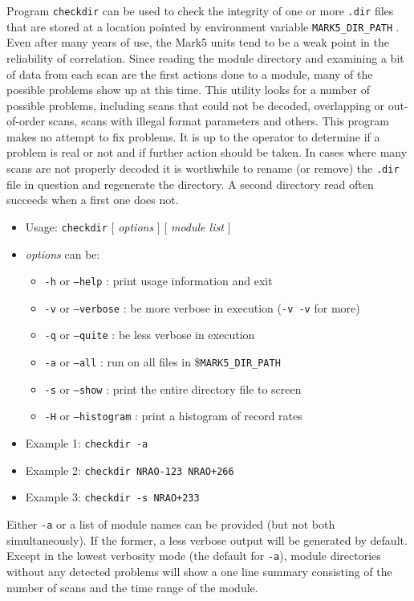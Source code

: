 Program {\tt checkdir} can be used to check the integrity of one or more {\tt .dir} files that are stored at a location pointed by environment variable {\tt MARK5\_DIR\_PATH} .
Even after many years of use, the Mark5 units tend to be a weak point in the reliability of correlation.
Since reading the module directory and examining a bit of data from each scan are the first actions done to a module, many of the possible problems show up at this time.
This utility looks for a number of possible problems, including scans that could not be decoded, overlapping or out-of-order scans, scans with illegal format parameters and others.
This program makes no attempt to fix problems.
It is up to the operator to determine if a problem is real or not and if further action should be taken.
In cases where many scans are not properly decoded it is worthwhile to rename (or remove) the {\tt .dir} file in question and regenerate the directory.  
A second directory read often succeeds when a first one does not.

\begin{itemize}
\item[] Usage: {\tt checkdir} $[$ {\em options} $]$ $[$ {\em module list} $]$
\item[] {\em options} can be:
\begin{itemize}
\item[] {\tt -h} or {\tt --help} : print usage information and exit
\item[] {\tt -v} or {\tt --verbose} : be more verbose in execution ({\tt -v -v} for more)
\item[] {\tt -q} or {\tt --quite} : be less verbose in execution
\item[] {\tt -a} or {\tt --all} : run on all files in \${\tt MARK5\_DIR\_PATH} 
\item[] {\tt -s} or {\tt --show} : print the entire directory file to screen
\item[] {\tt -H} or {\tt --histogram} : print a histogram of record rates
\end{itemize}
\item[] Example 1: {\tt checkdir -a}
\item[] Example 2: {\tt checkdir NRAO-123 NRAO+266}
\item[] Example 3: {\tt checkdir -s NRAO+233}
\end{itemize}

Either {\tt -a} or a list of module names can be provided (but not both simultaneously).
If the former, a less verbose output will be generated by default.
Except in the lowest verbosity mode (the default for {\tt -a}), module directories without any detected problems will show a one line summary consisting of the number of scans and the time range of the module.







